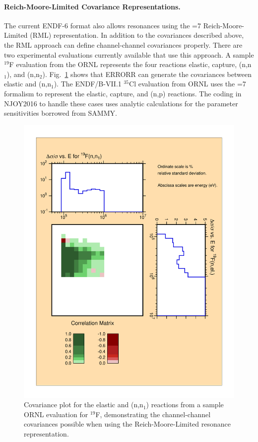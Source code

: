 \paragraph{Reich-Moore-Limited Covariance Representations.}
The current ENDF-6 format also allows resonances using the =7
Reich-Moore-Limited (RML)
representation.  In addition to the covariances described above, the
RML approach can define channel-channel covariances properly.  There
are two experimental evaluations currently available that use this
approach.  A sample $^{19}$F evaluation from the ORNL
 represents the
four reactions elastic, capture, (n,n$_1$), and (n,n$_2$).
 Fig.~\ref{covyy} shows that ERRORR can generate the covariances
between elastic and (n,n$_1$).  The ENDF/B-VII.1 $^{35}$Cl
evaluation from ORNL uses the =7 formalism to
represent the elastic, capture, and (n,p) reactions.  The
coding in NJOY2016 to handle these cases uses analytic calculations
for the parameter sensitivities borrowed from SAMMY\cite{SAMMY}.

\begin{figure}[t]\centering
\includegraphics[keepaspectratio, width=5in,angle=0]{figs/covyyack}
\caption[Example of elastic scattering and (n,n$_1$) covariance data]
{Covariance plot for the elastic and (n,n$_1$) reactions from a
 sample ORNL evaluation for $^{19}$F, demonstrating the channel-channel
 covariances possible when using the Reich-Moore-Limited resonance
 representation.}
\label{covyy}
\end{figure}

